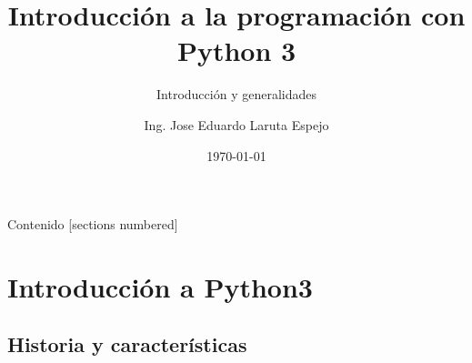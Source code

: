 \documentclass[10pt]{beamer}
\title{Introducción a la programación con Python 3}
\subtitle{Introducción y generalidades}
\date{\today}
\author{Ing. Jose Eduardo Laruta Espejo}
\institute{Universidad La Salle}
\begin{document}
\maketitle

\begin{frame}[allowframebreaks]{Contenido}
  [sections numbered]
  \tableofcontents[]
\end{frame}


\section{Introducción a Python3}
\subsection{Historia y características}
\end{document}
